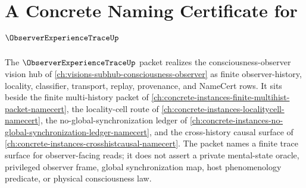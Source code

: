 \chapter{A Concrete Naming Certificate for $\ObserverExperienceTraceUp$}
\label{ch:concrete-instances-observer-experience-trace-namecert}

The $\ObserverExperienceTraceUp$ packet realizes the consciousness-observer vision hub of \autoref{ch:visions-subhub-consciousness-observer} as finite observer-history, locality, classifier, transport, replay, provenance, and NameCert rows. It sits beside the finite multi-history packet of \autoref{ch:concrete-instances-finite-multihist-packet-namecert}, the locality-cell route of \autoref{ch:concrete-instances-localitycell-namecert}, the no-global-synchronization ledger of \autoref{ch:concrete-instances-no-global-synchronization-ledger-namecert}, and the cross-history causal surface of \autoref{ch:concrete-instances-crosshistcausal-namecert}. The packet names a finite trace surface for observer-facing reads; it does not assert a private mental-state oracle, privileged observer frame, global synchronization map, host phenomenology predicate, or physical consciousness law.

